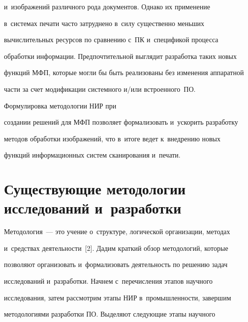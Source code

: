 и~изображений различного рода документов. Однако их применение  


в~сис\-те\-мах печати час\-то за\-труд\-не\-но в~силу существенно меньших 


вы\-чис\-ли\-тель\-ных ресурсов по срав\-не\-нию с~ПК и~спецификой процесса 


обработки информации. Предпочтительной выглядит разработка таких новых 


функций МФП, которые могли бы быть реализованы без изменения аппаратной 


час\-ти за счет модификации сис\-тем\-но\-го и\!/\!или встро\-ен\-но\-го~ПО.


  


  Формулировка методологии НИР при 


создании решений для МФП поз\-во\-ля\-ет формализовать и~ускорить разработку 


методов обработки изображений, что в~итоге ведет к~внед\-ре\-нию новых 


функций информационных сис\-тем сканирования и~пе\-чати.





\vspace*{-3pt}


  


\section{Существующие методологии исследований и~разработки}





\vspace*{-3pt}


  


  Методология~--- это учение о~структуре, логической организации, методах 


  и~средствах деятельности~[2]. Дадим крат\-кий обзор методологий, которые 


поз\-во\-ля\-ют организовать и~формализовать де\-я\-тель\-ность по решению задач 


исследований и~разработки. Начнем с~пе\-ре\-чис\-ле\-ния этапов научного 


исследования, затем рас\-смот\-рим этапы НИР в~про\-мыш\-лен\-ности, завершим 


методологиями разработки ПО. Выделяют сле\-ду\-ющие этапы научного 


